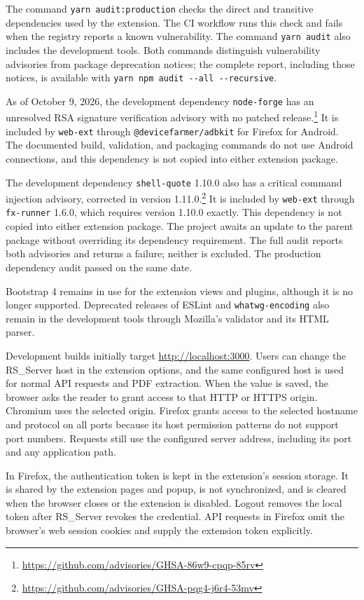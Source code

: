 \documentclass[a4paper, english]{article}
\newcommand{\rsserver}{RS\_Server\xspace}
\begin{document}
The command \verb|yarn audit:production| checks the direct and transitive dependencies used by the extension. The CI workflow runs this check and fails when the registry reports a known vulnerability. The command \verb|yarn audit| also includes the development tools. Both commands distinguish vulnerability advisories from package deprecation notices; the complete report, including those notices, is available with \verb|yarn npm audit --all --recursive|.

As of October 9, 2026, the development dependency \verb|node-forge| has an unresolved RSA signature verification advisory with no patched release.\footnote{\url{https://github.com/advisories/GHSA-86w9-cpqp-85rv}} It is included by \verb|web-ext| through \verb|@devicefarmer/adbkit| for Firefox for Android. The documented build, validation, and packaging commands do not use Android connections, and this dependency is not copied into either extension package.

The development dependency \verb|shell-quote| 1.10.0 also has a critical command injection advisory, corrected in version 1.11.0.\footnote{\url{https://github.com/advisories/GHSA-pqg4-j6r4-53mv}} It is included by \verb|web-ext| through \verb|fx-runner| 1.6.0, which requires version 1.10.0 exactly. This dependency is not copied into either extension package. The project awaits an update to the parent package without overriding its dependency requirement. The full audit reports both advisories and returns a failure; neither is excluded. The production dependency audit passed on the same date.

Bootstrap 4 remains in use for the extension views and plugins, although it is no longer supported. Deprecated releases of ESLint and \verb|whatwg-encoding| also remain in the development tools through Mozilla's validator and its HTML parser.

Development builds initially target \url{http://localhost:3000}. Users can change the \rsserver host in the extension options, and the same configured host is used for normal API requests and PDF extraction. When the value is saved, the browser asks the reader to grant access to that HTTP or HTTPS origin. Chromium uses the selected origin. Firefox grants access to the selected hostname and protocol on all ports because its host permission patterns do not support port numbers. Requests still use the configured server address, including its port and any application path.

In Firefox, the authentication token is kept in the extension's session storage. It is shared by the extension pages and popup, is not synchronized, and is cleared when the browser closes or the extension is disabled. Logout removes the local token after \rsserver revokes the credential. API requests in Firefox omit the browser's web session cookies and supply the extension token explicitly.
\end{document}
